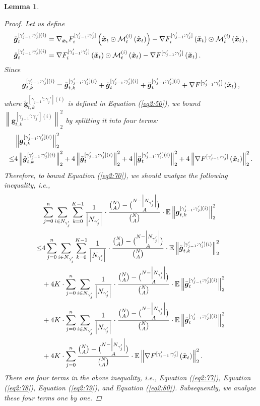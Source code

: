 \documentclass{article}
\theoremstyle{plain}
\newtheorem{lemma}[theorem]{Lemma}
\theoremstyle{definition}
\theoremstyle{remark}
\newcommand{\E}{\mathbb{E}}
\renewcommand{\eqref}[1]{Equation (\ref{#1})}
\newcommand{\bracket}[1]{\left(#1\right)}
\newcommand{\norm}[1]{\left\|#1\right\|_2^2}
\newcommand{\newmaskgradcons}[3]{\nabla_{\x{#2}} F_{#1}^{[\gamma_{#3-1}':\gamma_{#3}']} \bracket{\x{#2} \odot \mask{#1}{#2} \bracket{\x{#2}}}}
\newcommand{\globaloutergradgammacons}[2]{\nabla F^{[\gamma_{#1-1}': \gamma_{#1}']}\bracket{\x{#2}}}
\newcommand{\localoutergammacons}[3]{\nabla F_{#1}^{[\gamma_{#3-1}': \gamma_{#3}']}\bracket{\x{#2}} \odot \mask{#1}{#2} \bracket{\x{#2}} }
\begin{document}
\begin{lemma}
\begin{proof}
Let us define 
\begin{align}
\bar{\boldsymbol{g}}^{[\gamma_{j-1}':\gamma_{j}'](i)}_{t} &= \newmaskgradcons{i}{t}{j} - \localoutergammacons{i}{t}{j},\\
\Ddot{\boldsymbol{g}}_{t}^{[\gamma_{j-1}':\gamma_{j}'](i)} &= \localoutergammacons{i}{t}{j} - \globaloutergradgammacons{j}{t}. 
\end{align}
Since
\begin{align}
\boldsymbol{g}_{t,k}^{[\gamma_{j-1}':\gamma_{j}'](i)} = \tilde{\boldsymbol{g}}^{[\gamma_{j-1}':\gamma_{j}'] (i)}_{t, k} + \bar{\boldsymbol{g}}^{[\gamma_{j-1}':\gamma_{j}'](i)}_{t} + \Ddot{\boldsymbol{g}}^{[\gamma_{j-1}':\gamma_{j}'](i)}_{t} + \globaloutergradgammacons{j}{t},
\end{align}
where $\tilde{\boldsymbol{g}}^{[\gamma_{j-1}':\gamma_{j}'] (i)}_{t, k}$ is defined in \eqref{eq2:50}, we bound $\norm{\boldsymbol{g}_{t,k}^{[\gamma_{j-1}':\gamma_{j}'](i)}}$ by splitting it into four terms: 
\begin{align}
& \norm{\boldsymbol{g}_{t,k}^{[\gamma_{j-1}':\gamma_{j}'](i)}} \\
\leq & 4  \norm{ \tilde{\boldsymbol{g}}^{[\gamma_{j-1}':\gamma_{j}'] (i)}_{t, k} } + 4 \norm{ \bar{\boldsymbol{g}}^{[\gamma_{j-1}':\gamma_{j}'](i)}_{t} } + 4 \norm{ \Ddot{\boldsymbol{g}}_{t}^{[\gamma_{j-1}':\gamma_{j}'](i)} } + 4 \norm{\globaloutergradgammacons{j}{t}}.
\end{align}
Therefore, to bound \eqref{eq2:70}, we should analyze the following inequality, i.e., 
\begin{align}
&\sum_{j=0}^{n} \sum_{i \in \n{j}} \sum_{k=0}^{K-1} \frac{1}{\left|\n{j}\right|} \cdot \frac{\binom{N}{A} - \binom{N - \left|\n{j}\right|}{A}}{\binom{N}{A}} \cdot \E \norm{\boldsymbol{g}_{t,k}^{[\gamma_{j-1}':\gamma_{j}'](i)}} \\
\leq & 4 \sum_{j=0}^{n} \sum_{i \in \n{j}} \sum_{k=0}^{K-1} \frac{1}{\left|\n{j}\right|} \cdot \frac{\binom{N}{A} - \binom{N - \left|\n{j}\right|}{A}}{\binom{N}{A}} \cdot \E \norm{ \tilde{\boldsymbol{g}}^{[\gamma_{j-1}':\gamma_{j}'] (i)}_{t, k} } \label{eq2:77} \\
& + 4 K \cdot \sum_{j=0}^{n} \sum_{i \in \n{j}} \frac{1}{\left|\n{j}\right|} \cdot \frac{\binom{N}{A} - \binom{N - \left|\n{j}\right|}{A}}{\binom{N}{A}} \cdot \E\norm{ \bar{\boldsymbol{g}}^{[\gamma_{j-1}':\gamma_{j}'](i)}_{t} } \label{eq2:78} \\
& + 4 K \cdot \sum_{j=0}^{n} \sum_{i \in \n{j}} \frac{1}{\left|\n{j}\right|} \cdot \frac{\binom{N}{A} - \binom{N - \left|\n{j}\right|}{A}}{\binom{N}{A}} \cdot \E\norm{ \Ddot{\boldsymbol{g}}_{t}^{[\gamma_{j-1}':\gamma_{j}'](i)} } \label{eq2:79} \\
& + 4 K \cdot \sum_{j=0}^{n} \frac{\binom{N}{A} - \binom{N - \left|\n{j}\right|}{A}}{\binom{N}{A}} \cdot \E\norm{\globaloutergradgammacons{j}{t}}. \label{eq2:80}
\end{align}
There are four terms in the above inequality, i.e., \eqref{eq2:77}, \eqref{eq2:78}, \eqref{eq2:79}, and \eqref{eq2:80}. Subsequently, we analyze these four terms one by one. 


\end{proof}
\end{lemma}
\end{document}
